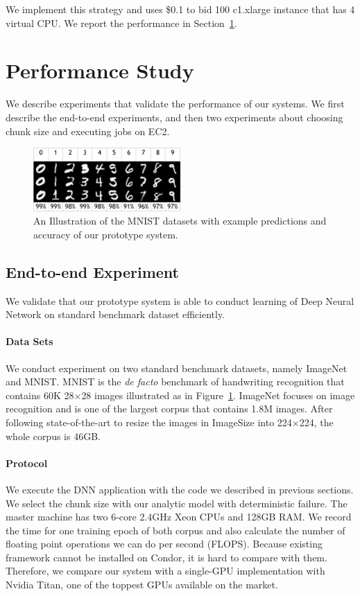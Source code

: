 \documentclass[11pt]{article}
\begin{document}
We implement this strategy and uses \$0.1 to bid 100 c1.xlarge
instance that has 4 virtual CPU. We report the performance in 
Section~\ref{sec:perf}.


\section{Performance Study} \label{sec:perf}

We describe experiments that validate the performance of our systems.
We first describe the end-to-end experiments, and then two
experiments about choosing chunk size and executing jobs on EC2.

\begin{figure}[t]
\centering
\includegraphics[width=0.5\textwidth]{figures/result-crop}
\caption{An Illustration of the MNIST datasets with
example predictions and accuracy of our prototype system.}
\label{fig:mnist}
\end{figure}


\subsection{End-to-end Experiment}

We validate that our prototype system is able to conduct
learning of Deep Neural Network on standard benchmark dataset
efficiently.

\paragraph*{Data Sets} We conduct experiment on two standard
benchmark datasets, namely ImageNet and MNIST. MNIST is the
{\em de facto} benchmark of handwriting recognition that contains
60K 28$\times$28 images illustrated as in Figure~\ref{fig:mnist}. ImageNet
focuses on image recognition and is one of the largest corpus
that contains 1.8M images. After following state-of-the-art to
resize the images in ImageSize into 224$\times$224, the whole
corpus is 46GB.

\paragraph*{Protocol} We execute the DNN application with the
code we described in previous sections. We select the chunk size with
our analytic model with deterministic failure. The master
machine has two 6-core 2.4GHz Xeon CPUs and 128GB RAM.
We record the time for one training epoch of both corpus
and also calculate the number of floating point operations
we can do per second (FLOPS). Because existing framework
cannot be installed on Condor, it is hard to compare with them.
Therefore, we compare our system with a single-GPU implementation
with Nvidia Titan, one of the toppest GPUs available on the market.
\end{document}
